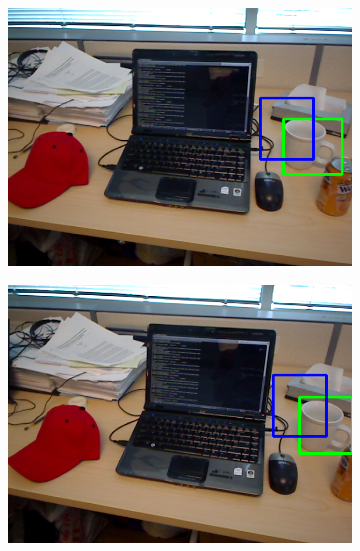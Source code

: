 \begin{figure}
	\begin{subfigure}[b]{0.3\textwidth}
		\includegraphics[width=\textwidth]{img/seguimiento_solo_frame/solo_frame-desk_1-coffee_mug_5-frame_29.png}
	\end{subfigure}
	\begin{subfigure}[b]{0.3\textwidth}
		\includegraphics[width=\textwidth]{img/seguimiento_solo_frame/solo_frame-desk_1-coffee_mug_5-frame_30.png}
	\end{subfigure}
	\begin{subfigure}[b]{0.3\textwidth}

\end{subfigure}
\end{figure}
